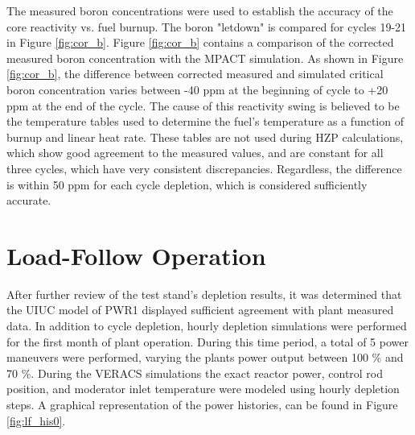 \documentclass[edeposit,fullpage,11pt]{uiucthesis2009}
\begin{document}
The measured boron concentrations were used to establish the accuracy of the core reactivity vs. fuel burnup. 
The boron "letdown" is compared for cycles 19-21 in Figure \ref{fig:cor_b}. 
Figure \ref{fig:cor_b} contains a comparison of the corrected measured boron concentration with the MPACT simulation. 
As shown in Figure \ref{fig:cor_b}, the difference between corrected measured and simulated critical boron concentration varies between -40 ppm at the beginning of cycle to +20 ppm at the end of the cycle. 
The cause of this reactivity swing is believed to be the temperature tables used to determine the fuel's temperature as a function of burnup and linear heat rate.
These tables are not used during \gls{HZP} calculations, which show good agreement to the measured values, and are constant for all three cycles, which have very consistent discrepancies.
Regardless, the difference is within 50 ppm for each cycle depletion, which is considered sufficiently accurate.

\section{Load-Follow Operation}

After further review of the test stand's depletion results, it was determined that the \gls{UIUC} model of PWR1 displayed sufficient agreement with plant measured data. 
In addition to cycle depletion, hourly depletion simulations were performed for the first month of plant operation.
During this time period, a total of 5 power maneuvers were performed, varying the plants power output between 100 \% and 70 \%.
During the \gls{VERACS} simulations the exact reactor power, control rod position, and moderator inlet temperature were modeled using hourly depletion steps.
A graphical representation of the power histories, can be found in Figure \ref{fig:lf_his0}.
\end{document}
